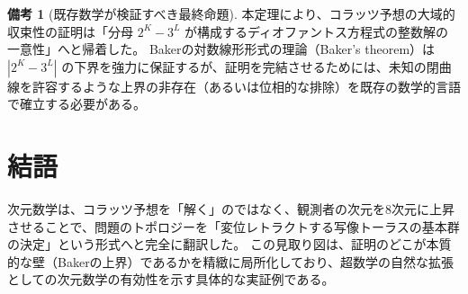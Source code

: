 \documentclass[11pt,a4paper]{article}
\theoremstyle{definition}
\newtheorem{remark}{備考}[section]
\begin{document}
\begin{remark}[既存数学が検証すべき最終命題]
本定理により、コラッツ予想の大域的収束性の証明は「分母 $2^K - 3^L$ が構成するディオファントス方程式の整数解の一意性」へと帰着した。
Bakerの対数線形形式の理論（Baker's theorem）は $|2^K - 3^L|$ の下界を強力に保証するが、証明を完結させるためには、未知の閉曲線を許容するような上界の非存在（あるいは位相的な排除）を既存の数学的言語で確立する必要がある。
\end{remark}

\section*{結語}

次元数学は、コラッツ予想を「解く」のではなく、観測者の次元を8次元に上昇させることで、問題のトポロジーを「変位レトラクトする写像トーラスの基本群の決定」という形式へと完全に翻訳した。
この見取り図は、証明のどこが本質的な壁（Bakerの上界）であるかを精緻に局所化しており、超数学の自然な拡張としての次元数学の有効性を示す具体的な実証例である。
\end{document}
